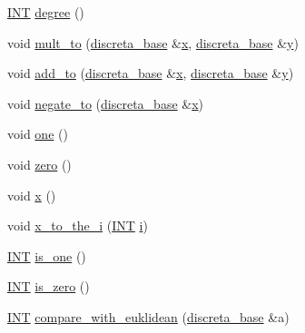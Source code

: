 \begin{DoxyCompactItemize}
\item 
\mbox{\hyperlink{galois_8h_a09fddde158a3a20bd2dcadb609de11dc}{I\+NT}} \mbox{\hyperlink{classunipoly_ab2b9692ea17ce32c0c8f2cc246517e37}{degree}} ()
\item 
void \mbox{\hyperlink{classunipoly_a95bf7f347a5630f0d3f9737ffe22a341}{mult\+\_\+to}} (\mbox{\hyperlink{classdiscreta__base}{discreta\+\_\+base}} \&\mbox{\hyperlink{classunipoly_a193127c4c6cf419d995882bb5b762294}{x}}, \mbox{\hyperlink{classdiscreta__base}{discreta\+\_\+base}} \&\mbox{\hyperlink{alphabet2_8_c_a0a2f84ed7838f07779ae24c5a9086d33}{y}})
\item 
void \mbox{\hyperlink{classunipoly_abebdaf912a2b0e7c27470f4191d0e180}{add\+\_\+to}} (\mbox{\hyperlink{classdiscreta__base}{discreta\+\_\+base}} \&\mbox{\hyperlink{classunipoly_a193127c4c6cf419d995882bb5b762294}{x}}, \mbox{\hyperlink{classdiscreta__base}{discreta\+\_\+base}} \&\mbox{\hyperlink{alphabet2_8_c_a0a2f84ed7838f07779ae24c5a9086d33}{y}})
\item 
void \mbox{\hyperlink{classunipoly_a2181196b44786790f58b72510620db97}{negate\+\_\+to}} (\mbox{\hyperlink{classdiscreta__base}{discreta\+\_\+base}} \&\mbox{\hyperlink{classunipoly_a193127c4c6cf419d995882bb5b762294}{x}})
\item 
void \mbox{\hyperlink{classunipoly_a12db8572d9d5a2edba5b7a4562f6e746}{one}} ()
\item 
void \mbox{\hyperlink{classunipoly_a8fd1c1a5602dc59b0e1a68bee23d60b6}{zero}} ()
\item 
void \mbox{\hyperlink{classunipoly_a193127c4c6cf419d995882bb5b762294}{x}} ()
\item 
void \mbox{\hyperlink{classunipoly_a1415216fadad08456f6c70403b522f6e}{x\+\_\+to\+\_\+the\+\_\+i}} (\mbox{\hyperlink{galois_8h_a09fddde158a3a20bd2dcadb609de11dc}{I\+NT}} \mbox{\hyperlink{alphabet2_8_c_acb559820d9ca11295b4500f179ef6392}{i}})
\item 
\mbox{\hyperlink{galois_8h_a09fddde158a3a20bd2dcadb609de11dc}{I\+NT}} \mbox{\hyperlink{classunipoly_a1840dc8eb1a17b1764b108c96299738d}{is\+\_\+one}} ()
\item 
\mbox{\hyperlink{galois_8h_a09fddde158a3a20bd2dcadb609de11dc}{I\+NT}} \mbox{\hyperlink{classunipoly_a7bff4146466929655bf2bcfd42c682cf}{is\+\_\+zero}} ()
\item 
\mbox{\hyperlink{galois_8h_a09fddde158a3a20bd2dcadb609de11dc}{I\+NT}} \mbox{\hyperlink{classunipoly_ae51f546d1fadd05e03bc71df1aa57d64}{compare\+\_\+with\+\_\+euklidean}} (\mbox{\hyperlink{classdiscreta__base}{discreta\+\_\+base}} \&a)
\item 

\end{DoxyCompactItemize}
